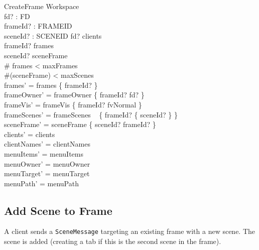 \documentclass[a4paper,10pt,fleqn]{article}
\begin{document}
\begin{schema}{CreateFrame}
  \Delta Workspace \\
  fd? : FD \\
  frameId? : FRAMEID \\
  sceneId? : SCENEID
  \where
  fd? \in clients \\
  frameId? \notin frames \\
  sceneId? \notin \dom sceneFrame \\
  \# frames < maxFrames \\
  \#(\dom sceneFrame) < maxScenes \\
  frames' = frames \cup \{ frameId? \} \\
  frameOwner' = frameOwner \cup \{ frameId? \mapsto fd? \} \\
  frameVis' = frameVis \cup \{ frameId? \mapsto fvNormal \} \\
  frameScenes' = frameScenes \cup
  \quad~ \{ frameId? \mapsto \{ sceneId? \} \} \\
  sceneFrame' = sceneFrame \cup \{ sceneId? \mapsto frameId? \} \\
  clients' = clients \\
  clientNames' = clientNames \\
  menuItems' = menuItems \\
  menuOwner' = menuOwner \\
  menuTarget' = menuTarget \\
  menuPath' = menuPath
\end{schema}

\subsection{Add Scene to Frame}

A client sends a \texttt{SceneMessage} targeting an existing frame
with a new scene.  The scene is added (creating a tab if this is
the second scene in the frame).
\end{document}

